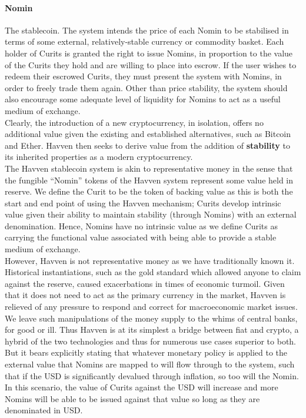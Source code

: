 \paragraph{Nomin} The stablecoin. The system intends the price of each Nomin to be stabilised in terms of some external, relatively-stable currency or commodity basket. Each holder of Curits is granted the right to issue Nomins, in proportion to the value of the Curits they hold and are willing to place into escrow. If the user wishes to redeem their escrowed Curits, they must present the system with Nomins, in order to freely trade them again. Other than price stability, the system should also encourage some adequate level of liquidity for Nomins to act as a useful medium of exchange. \\

\noindent Clearly, the introduction of a new cryptocurrency, in isolation, offers no additional value given the existing and established alternatives, such as Bitcoin and Ether. Havven then seeks to derive value from the addition of \textbf{stability} to its inherited properties as a modern cryptocurrency. \\

\noindent The Havven stablecoin system is akin to representative money in the sense that the fungible ``Nomin'' tokens of the Havven system represent some value held in reserve. We define the Curit to be the token of backing value as this is both the start and end point of using the Havven mechanism; Curits develop intrinsic value given their ability to maintain stability (through Nomins) with an external denomination. Hence, Nomins have no intrinsic value as we define Curits as carrying the functional value associated with being able to provide a stable medium of exchange. \\

\noindent However, Havven is not representative money as we have traditionally known it. Historical instantiations, such as the gold standard which allowed anyone to claim against the reserve, caused exacerbations in times of economic turmoil. Given that it does not need to act as the primary currency in the market, Havven is relieved of any pressure to respond and correct for macroeconomic market issues. We leave such manipulations of the money supply to the whims of central banks, for good or ill. Thus Havven is at its simplest a bridge between fiat and crypto, a hybrid of the two technologies and thus for numerous use cases superior to both. But it bears explicitly stating that whatever monetary policy is applied to the external value that Nomins are mapped to will flow through to the system, such that if the USD is significantly devalued through inflation, so too will the Nomin. In this scenario, the value of Curits against the USD will increase and more Nomins will be able to be issued against that value so long as they are denominated in USD. \\


